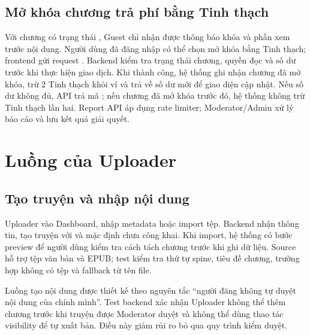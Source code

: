 \subsection{Mở khóa chương trả phí bằng Tinh thạch}

Với chương có trạng thái , Guest chỉ nhận được thông báo khóa và phần xem trước nội dung. Người dùng đã đăng nhập có thể chọn mở khóa bằng Tinh thạch; frontend gửi request . Backend kiểm tra trạng thái chương, quyền đọc và số dư trước khi thực hiện giao dịch. Khi thành công, hệ thống ghi nhận chương đã mở khóa, trừ 2 Tinh thạch khỏi ví và trả về số dư mới để giao diện cập nhật. Nếu số dư không đủ, API trả mã ; nếu chương đã mở khóa trước đó, hệ thống không trừ Tinh thạch lần hai.
Report API áp dụng rate limiter; Moderator/Admin xử lý báo cáo và lưu kết quả giải quyết.
\clearpage

\section{Luồng của Uploader}

\subsection{Tạo truyện và nhập nội dung}

Uploader vào Dashboard, nhập metadata hoặc import tệp. Backend nhận thông tin, tạo truyện với  và mặc định chưa công khai. Khi import, hệ thống có bước preview để người dùng kiểm tra cách tách chương trước khi ghi dữ liệu. Source hỗ trợ tệp văn bản và EPUB; test kiểm tra thứ tự spine, tiêu đề chương, trường hợp không có tệp và fallback từ tên file.

Luồng tạo nội dung được thiết kế theo nguyên tắc ``người đăng không tự duyệt nội dung của chính mình''. Test backend xác nhận Uploader không thể thêm chương trước khi truyện được Moderator duyệt và không thể dùng thao tác visibility để tự xuất bản. Điều này giảm rủi ro bỏ qua quy trình kiểm duyệt.

